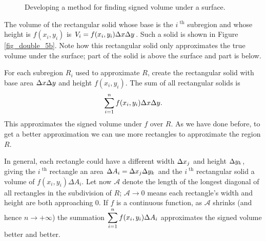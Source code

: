 \begin{figure}
\centering
\qquad
{}
\caption{Developing a method for finding signed volume under a surface. }
\end{figure}



The volume of the rectangular solid whose base is the $i^\text{ th}$ subregion and whose height is $f(x_i,y_i)$ is $V_i=f(x_i,y_i)\Delta x\Delta y$. Such a  solid is shown in Figure \ref{fig_double_5b}. Note how this rectangular solid only approximates the true volume under the surface; part of the solid is above the surface and part is below.

For each subregion $R_i$ used to approximate $R$, create the rectangular solid with base area $\Delta x\Delta y$ and height $f(x_i,y_i)$. 
The sum of all rectangular solids is $$\displaystyle \sum_{i=1}^n f(x_i,y_i)\Delta x\Delta y.$$ This approximates the signed volume under $f$ over $R$. As we have done before, to get a better approximation we can use more rectangles to approximate the region $R$.

In general, each rectangle could have a different width $\Delta x_j$ and height $\Delta y_k$, giving the $i^\text{ th}$ rectangle an area $\Delta A_i = \Delta x_j\Delta y_k$ and the $i^\text{ th}$ rectangular solid a volume of $f(x_i,y_i)\Delta A_i$. Let now $\mathcal{A}$ denote the length of the longest diagonal of all rectangles in the subdivision of $R$; $\mathcal{A}\to 0$ means each rectangle's width and height are both approaching 0. If $f$ is a continuous function, as $\mathcal{A}$ shrinks (and hence $n\to +\infty$) the summation $\displaystyle \sum_{i=1}^n f(x_i,y_i)\Delta A_i$ approximates the signed volume better and better. 

